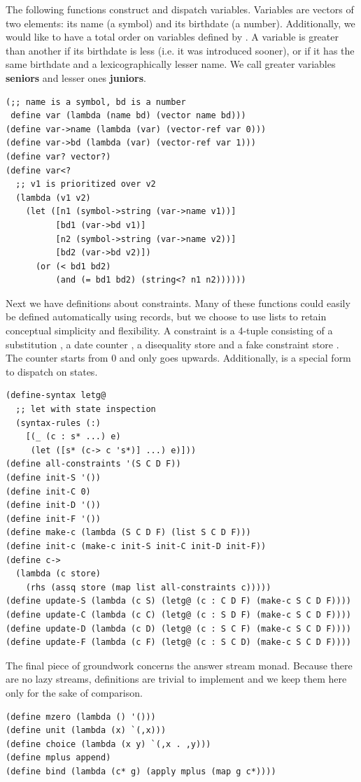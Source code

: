 The following functions construct and dispatch variables. Variables are vectors of two elements: its name (a symbol) and its birthdate (a number). Additionally, we would like to have a total order on variables defined by . A variable is greater than another if its birthdate is less (i.e. it was introduced sooner), or if it has the same birthdate and a lexicographically lesser name. We call greater variables \textbf{seniors} and lesser ones \textbf{juniors}.
\begin{lstlisting}
(;; name is a symbol, bd is a number
 define var (lambda (name bd) (vector name bd)))
(define var->name (lambda (var) (vector-ref var 0)))
(define var->bd (lambda (var) (vector-ref var 1)))
(define var? vector?)
(define var<?
  ;; v1 is prioritized over v2
  (lambda (v1 v2)
    (let ([n1 (symbol->string (var->name v1))]
          [bd1 (var->bd v1)]
          [n2 (symbol->string (var->name v2))]
          [bd2 (var->bd v2)])
      (or (< bd1 bd2)
          (and (= bd1 bd2) (string<? n1 n2))))))
\end{lstlisting}

Next we have definitions about constraints. Many of these functions could easily be defined automatically using records, but we choose to use lists to retain conceptual simplicity and flexibility. A constraint is a 4-tuple consisting of a substitution , a date counter , a disequality store  and a fake constraint store . The counter starts from 0 and only goes upwards. Additionally,  is a special form to dispatch on states.
\begin{lstlisting}
(define-syntax letg@
  ;; let with state inspection
  (syntax-rules (:)
    [(_ (c : s* ...) e)
     (let ([s* (c-> c 's*)] ...) e)]))
(define all-constraints '(S C D F))
(define init-S '())
(define init-C 0)
(define init-D '())
(define init-F '())
(define make-c (lambda (S C D F) (list S C D F)))
(define init-c (make-c init-S init-C init-D init-F))
(define c->
  (lambda (c store)
    (rhs (assq store (map list all-constraints c)))))
(define update-S (lambda (c S) (letg@ (c : C D F) (make-c S C D F))))
(define update-C (lambda (c C) (letg@ (c : S D F) (make-c S C D F))))
(define update-D (lambda (c D) (letg@ (c : S C F) (make-c S C D F))))
(define update-F (lambda (c F) (letg@ (c : S C D) (make-c S C D F))))
\end{lstlisting}

The final piece of groundwork concerns the answer stream monad. Because there are no lazy streams, definitions are trivial to implement and we keep them here only for the sake of comparison.
\begin{lstlisting}
(define mzero (lambda () '()))
(define unit (lambda (x) `(,x)))
(define choice (lambda (x y) `(,x . ,y)))
(define mplus append)
(define bind (lambda (c* g) (apply mplus (map g c*))))
\end{lstlisting}

